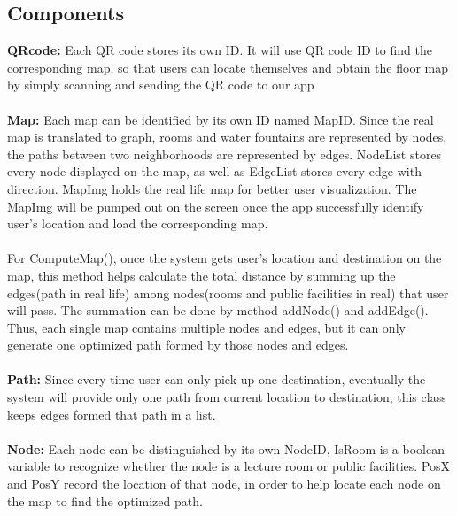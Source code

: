 \documentclass[12pt]{article}
\begin{document}
\subsection{Components}
\textbf{QRcode:}
	Each QR code stores its own ID. It will use QR code ID to find the corresponding map, so that users can locate themselves and obtain the floor map by simply scanning and sending the QR code to our app
\\ \\
\textbf{Map: }
	Each map can be identified by its own ID named MapID. Since the real map is translated to graph, rooms and water fountains are represented by nodes, the paths between two neighborhoods are represented by edges. NodeList stores every node displayed on the map, as well as EdgeList stores every edge with direction.  MapImg holds the real life map for better user visualization.  The MapImg will be pumped out on the screen once the app successfully identify user’s location and load the corresponding map.
\\ \\ For ComputeMap(), once the system gets user’s location and destination on the map, this method helps calculate the total distance by summing up the edges(path in real life) among nodes(rooms and public facilities in real) that user will pass. The summation can be done by method addNode() and addEdge(). Thus, each single map contains multiple nodes and edges, but it can only generate one optimized path formed by those nodes and edges.
\\ \\
\textbf{Path:}
	Since every time user can only pick up one destination, eventually the system will provide only one path from current location to destination, this class keeps edges formed that path in a list.
\\ \\

\textbf{Node:}
Each node can be distinguished by its own NodeID, IsRoom is a boolean variable to recognize whether the node is a lecture room or public facilities. PosX and PosY record the location of that node, in order to help locate each node on the map to find the optimized path.  
\\ 
\end{document}

